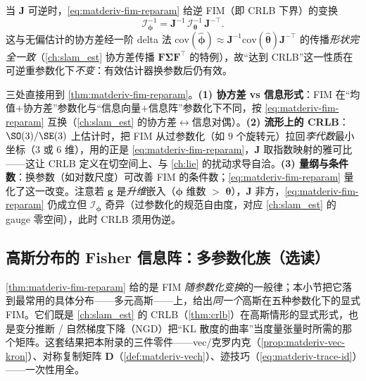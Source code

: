 \begin{corollary}\label{cor:matderiv-crlb-reparam}
当 $\mathbf{J}$ 可逆时，\cref{eq:matderiv-fim-reparam} 给逆 FIM（即 CRLB 下界）的变换
\begin{equation}
  \boldsymbol{\mathcal{I}}_{\boldsymbol{\phi}}^{-1}=\mathbf{J}^{-1}\,\boldsymbol{\mathcal{I}}_{\boldsymbol{\theta}}^{-1}\,\mathbf{J}^{-\top}.
  \label{eq:matderiv-crlb-reparam}
\end{equation}
这与无偏估计的协方差经一阶 delta 法 $\mathrm{cov}(\hat{\boldsymbol{\phi}})\approx\mathbf{J}^{-1}\mathrm{cov}(\hat{\boldsymbol{\theta}})\mathbf{J}^{-\top}$ 的传播\emph{形状完全一致}（\cref{ch:slam_est} 协方差传播 $\mathbf{F}\boldsymbol{\Sigma}\mathbf{F}^\top$ 的特例），故“达到 CRLB”这一性质在可逆重参数化下\emph{不变}：有效估计器换参数后仍有效。
\end{corollary}

\begin{insight}[为什么本书关心这件事]
三处直接用到 \cref{thm:matderiv-fim-reparam}。\textbf{(1) 协方差 vs 信息形式}：FIM 在“均值$+$协方差”参数化与“信息向量$+$信息阵”参数化下不同，按 \cref{eq:matderiv-fim-reparam} 互换（\cref{ch:slam_est} 的协方差$\leftrightarrow$信息对偶）。\textbf{(2) 流形上的 CRLB}：$\SO(3)/\SE(3)$ 上估计时，把 FIM 从过参数化（如 $9$ 个旋转元）拉回\emph{李代数}最小坐标（$3$ 或 $6$ 维），用的正是 \cref{eq:matderiv-fim-reparam}，$\mathbf{J}$ 取指数映射的雅可比——这让 CRLB 定义在切空间上、与 \cref{ch:lie} 的扰动求导自洽。\textbf{(3) 量纲与条件数}：换参数（如对数尺度）可改善 FIM 的条件数；\cref{eq:matderiv-fim-reparam} 量化了这一改变。注意若 $\mathbf{g}$ 是\emph{升维}嵌入（$\boldsymbol{\phi}$ 维数 $>$ $\boldsymbol{\theta}$），$\mathbf{J}$ 非方，\cref{eq:matderiv-fim-reparam} 仍成立但 $\boldsymbol{\mathcal{I}}_{\boldsymbol{\phi}}$ 奇异（过参数化的规范自由度，对应 \cref{ch:slam_est} 的 gauge 零空间），此时 CRLB 须用伪逆。
\end{insight}

\subsection{高斯分布的 Fisher 信息阵：多参数化族（选读）}
\label{sec:matderiv-gauss-fim}

\cref{thm:matderiv-fim-reparam} 给的是 FIM \emph{随参数化变换}的一般律；本小节把它落到最常用的具体分布——多元高斯——上，给出\emph{同一个}高斯在五种参数化下的显式 FIM。它们既是 \cref{ch:slam_est} 的 CRLB（\cref{thm:crlb}）在高斯情形的显式形式，也是变分推断 / 自然梯度下降（NGD）把“KL 散度的曲率”当度量张量时所需的那个矩阵\cite{barfoot2024state,amari1998natural}。这套结果把本附录的三件零件——vec/克罗内克（\cref{prop:matderiv-vec-kron}）、对称复制矩阵 $\mathbf{D}$（\cref{def:matderiv-vech}）、迹技巧（\cref{eq:matderiv-trace-id}）——一次性用全。


